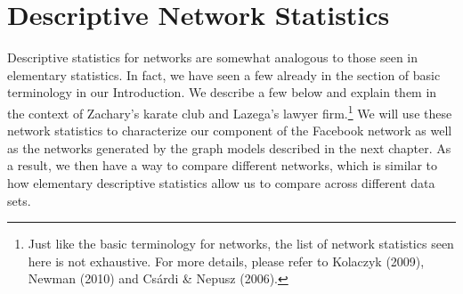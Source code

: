 \documentclass[12pt,twoside]{amherstthesis}
\begin{document}
  \chapter{Descriptive Network
  Statistics}\label{descriptive-network-statistics}
  
  Descriptive statistics for networks are somewhat analogous to those seen
  in elementary statistics. In fact, we have seen a few already in the
  section of basic terminology in our Introduction. We describe a few
  below and explain them in the context of Zachary's karate club and
  Lazega's lawyer firm.\footnote{Just like the basic terminology for
    networks, the list of network statistics seen here is not exhaustive.
    For more details, please refer to Kolaczyk (2009), Newman (2010) and
    Csárdi \& Nepusz (2006).} We will use these network statistics to
  characterize our component of the Facebook network as well as the
  networks generated by the graph models described in the next chapter. As
  a result, we then have a way to compare different networks, which is
  similar to how elementary descriptive statistics allow us to compare
  across different data sets.
  
\end{document}
